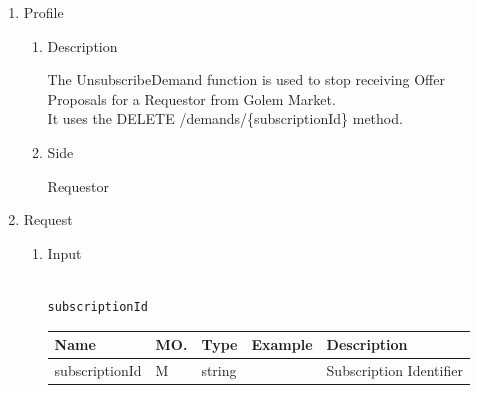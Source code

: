 \begin{enumerate}

\item Profile

\begin{enumerate}

\item Description

The UnsubscribeDemand function is used to stop receiving Offer Proposals for a Requestor from Golem Market. \\ 
It uses the DELETE /demands/\{subscriptionId\} method.

\item Side

Requestor

\end{enumerate}

\item Request

\begin{enumerate}

\item Input

\begin{tcolorbox}[boxrule=0pt, frame empty]
\begin{verbatim}

subscriptionId

\end{verbatim}
\end{tcolorbox}





\begin{center}
\begin{tabular}{|p{3cm}|l|p{3cm}|p{3cm}|p{4cm}|} 
\hline
\rowcolor{lightgray}	Name	& MO.	& Type	& Example & 	Description \\
\hline

subscriptionId	& M	& 	string	&		&	Subscription Identifier \\ 

\hline

\end{tabular}
\end{center}


\end{enumerate}
\end{enumerate}
